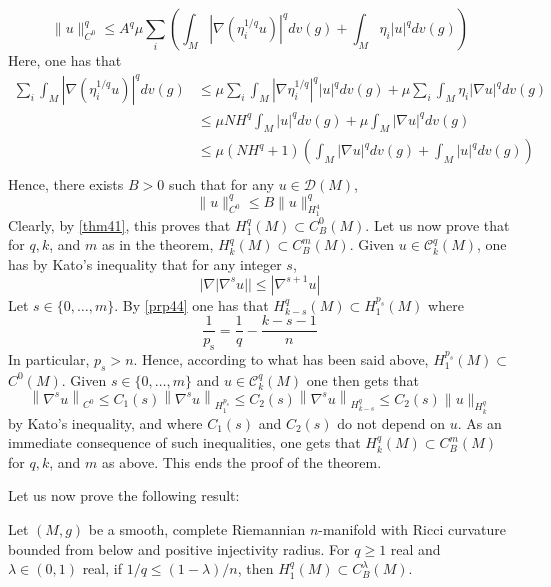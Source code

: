 \documentclass[12pt,hyperref,a4paper,UTF8]{ctexart}
\begin{document}
\begin{Proof}
$$
\|u\|_{C^0}^q \leq A^q \mu \sum_i\left(\int_M\left|\nabla\left(\eta_i^{1 / q} u\right)\right|^q d v(g)+\int_M \eta_i|u|^q d v(g)\right)
$$
Here, one has that
$$
\begin{aligned}
\sum_i \int_M\left|\nabla\left(\eta_i^{1 / q} u\right)\right|^q d v(g) &\leq \mu \sum_i \int_M\left|\nabla \eta_i^{1 / q}\right|^q|u|^q d v(g)+\mu \sum_i \int_M \eta_i|\nabla u|^q d v(g)\\
&\leq \mu N H^q \int_M|u|^q d v(g)+\mu \int_M|\nabla u|^q d v(g) \\
&\leq \mu\left(N H^q+1\right)\left(\int_M|\nabla u|^q d v(g)+\int_M|u|^q d v(g)\right)\\
\end{aligned}
$$
Hence, there exists $B>0$ such that for any $u \in \mathcal{D}(M)$,
$$
\|u\|_{C^0}^q \leq B\|u\|_{H_1^4}^q
$$
Clearly, by \autoref{thm41}, this proves that $H_1^q(M) \subset C_B^0(M)$. Let us now prove that for $q, k$, and $m$ as in the theorem, $H_k^q(M) \subset C_B^m(M)$. Given $u \in \mathcal{C}_k^q(M)$, one has by Kato's inequality that for any integer $s$,
$$
|\nabla| \nabla^s u|| \leq\left|\nabla^{s+1} u\right|
$$
Let $s \in\{0, \ldots, m\}$. By \autoref{prp44} one has that $H_{k-s}^q(M) \subset H_1^{p_s}(M)$ where
$$
\frac{1}{p_{\mathrm{s}}}=\frac{1}{q}-\frac{k-s-1}{n}
$$
In particular, $p_s>n$. Hence, according to what has been said above, $H_1^{p_s}(M) \subset$ $C^0(M)$. Given $s \in\{0, \ldots, m\}$ and $u \in \mathcal{C}_k^q(M)$ one then gets that
$$
\left\|\nabla^{s} u\right\|_{C^0} \leq C_1(s)\left\|\nabla^s u\right\|_{H_1^{p_s}} \leq C_2(s)\left\|\nabla^s u\right\|_{H_{k-s}^q} \leq C_2(s)\|u\|_{H_k^q}
$$
by Kato's inequality, and where $C_1(s)$ and $C_2(s)$ do not depend on $u$. As an immediate consequence of such inequalities, one gets that $H_k^q(M) \subset C_B^m(M)$ for $q, k$, and $m$ as above. This ends the proof of the theorem.
\end{Proof}

\vskip 3pt
Let us now prove the following result:

\begin{Theorem}
Let $(M, g)$ be a smooth, complete Riemannian $n$-manifold with Ricci curvature bounded from below and positive injectivity radius. For $q \geq 1$ real and $\lambda \in(0,1)$ real, if $1 / q \leq(1-\lambda) / n$, then $H_1^q(M) \subset C_B^\lambda(M)$.
\label{thm45}
\end{Theorem}
\end{document}
